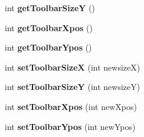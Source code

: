 \begin{DoxyCompactItemize}
int {\bfseries get\+Toolbar\+SizeY} ()
\item 
\mbox{\label{class_tool_bar_a6aef146b5f26c3676021d337a062e4ec}} 
int {\bfseries get\+Toolbar\+Xpos} ()
\item 
\mbox{\label{class_tool_bar_aebd047f20c4174f899c69b5845c26de9}} 
int {\bfseries get\+Toolbar\+Ypos} ()
\item 
\mbox{\label{class_tool_bar_a098fa7169404bbbac83de16f051b007b}} 
int {\bfseries set\+Toolbar\+SizeX} (int newsizeX)
\item 
\mbox{\label{class_tool_bar_a4d6dc59dfed61edcbf582ab517452a95}} 
int {\bfseries set\+Toolbar\+SizeY} (int newsizeY)
\item 
\mbox{\label{class_tool_bar_aed8ebab9a9f370ee7136530a9a40bc96}} 
int {\bfseries set\+Toolbar\+Xpos} (int new\+Xpos)
\item 
\mbox{\label{class_tool_bar_ac49f60a752329fb27010b438e8e6cd40}} 
int {\bfseries set\+Toolbar\+Ypos} (int new\+Ypos)
\end{DoxyCompactItemize}

